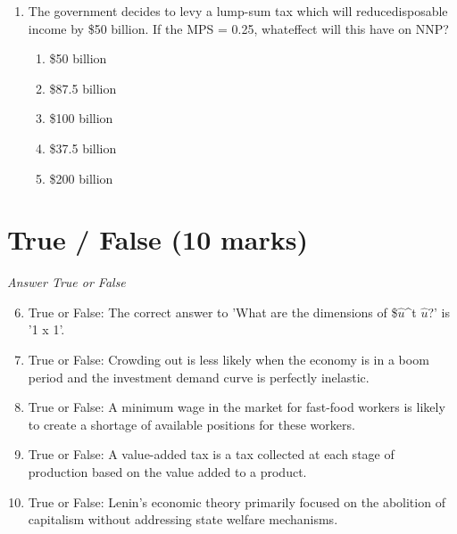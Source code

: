 \documentclass[12pt]{article}
\begin{document}
\begin{enumerate}[label=\arabic*.]
\begin{enumerate}[label=(\alph*)]
    \item the demand for goods and services decreases.
    \item the stock market crashes.
    \item bond prices fall.
    \item the nominal interest rate falls.
    \item the unemployment rate rises.
\end{enumerate}
\item The government decides to levy a lump-sum tax which will reducedisposable income by \$50 billion. If the MPS = 0.25, whateffect will this have on NNP?
\begin{enumerate}[label=(\alph*)]
    \item \$50 billion
    \item \$87.5 billion
    \item \$100 billion
    \item \$37.5 billion
    \item \$200 billion
\end{enumerate}
\end{enumerate}

\section*{True / False (10 marks)}
\textit{Answer True or False}
\begin{enumerate}[label=\arabic*.]
\setcounter{enumi}{5}
\item True or False: The correct answer to 'What are the dimensions of \$\ensuremath{\hat{u}}^t \ensuremath{\hat{u}}?' is '1 x 1'.
\item True or False: Crowding out is less likely when the economy is in a boom period and the investment demand curve is perfectly inelastic.
\item True or False: A minimum wage in the market for fast-food workers is likely to create a shortage of available positions for these workers.
\item True or False: A value-added tax is a tax collected at each stage of production based on the value added to a product.
\item True or False: Lenin's economic theory primarily focused on the abolition of capitalism without addressing state welfare mechanisms.
\end{enumerate}
\end{document}
